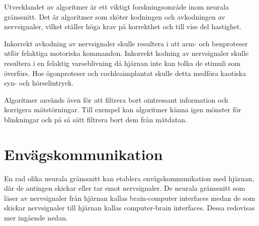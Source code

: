 \documentclass[12pt, a4paper]{article}
\begin{document}
Utvecklandet av algoritmer är ett viktigt forskningsområde inom neurala gränssnitt. Det är algoritmer som sköter kodningen och avkodningen av nervsignaler, vilket ställer höga krav på korrekthet och till viss del hastighet.

Inkorrekt avkodning av nervsignaler skulle resultera i att arm- och benproteser utför felaktiga motoriska kommandon. Inkorrekt kodning av nervsignaler skulle resultera i en felaktig varseblivning då hjärnan inte kan tolka de stimuli som överförs. Hos ögonproteser och cochleaimplantat skulle detta medföra kaotiska syn- och hörselintryck.




Algoritmer används även för att filtrera bort ointressant information och korrigera mätstörningar. Till exempel kan algoritmer känna igen mönster för blinkningar och på så sätt filtrera bort dem från mätdatan.


\section{Envägskommunikation}

En rad olika neurala gränssnitt kan etablera envägskommunikation med hjärnan, där de antingen skickar eller tar emot nervsignaler. De neurala gränssnitt som läser av nervsignaler från hjärnan kallas brain-computer interfaces medan de som skickar nervsignaler till hjärnan kallas computer-brain interfaces. Dessa redovisas mer ingående nedan.


\end{document}
